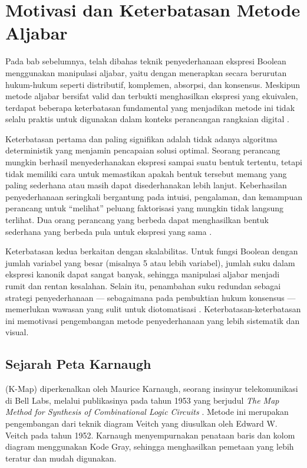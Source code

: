 \section{Motivasi dan Keterbatasan Metode Aljabar}

Pada bab sebelumnya, telah dibahas teknik penyederhanaan ekspresi Boolean menggunakan manipulasi aljabar, yaitu dengan menerapkan secara berurutan hukum-hukum seperti distributif, komplemen, absorpsi, dan konsensus. Meskipun metode aljabar bersifat valid dan terbukti menghasilkan ekspresi yang ekuivalen, terdapat beberapa keterbatasan fundamental yang menjadikan metode ini tidak selalu praktis untuk digunakan dalam konteks perancangan rangkaian digital \cite{rosen2019}.

Keterbatasan pertama dan paling signifikan adalah tidak adanya algoritma deterministik yang menjamin pencapaian solusi optimal. Seorang perancang mungkin berhasil menyederhanakan ekspresi sampai suatu bentuk tertentu, tetapi tidak memiliki cara untuk memastikan apakah bentuk tersebut memang yang paling sederhana atau masih dapat disederhanakan lebih lanjut. Keberhasilan penyederhanaan seringkali bergantung pada intuisi, pengalaman, dan kemampuan perancang untuk ``melihat'' peluang faktorisasi yang mungkin tidak langsung terlihat. Dua orang perancang yang berbeda dapat menghasilkan bentuk sederhana yang berbeda pula untuk ekspresi yang sama \cite{allaboutcircuits_boolean}.

Keterbatasan kedua berkaitan dengan skalabilitas. Untuk fungsi Boolean dengan jumlah variabel yang besar (misalnya 5 atau lebih variabel), jumlah suku dalam ekspresi kanonik dapat sangat banyak, sehingga manipulasi aljabar menjadi rumit dan rentan kesalahan. Selain itu, penambahan suku redundan sebagai strategi penyederhanaan --- sebagaimana pada pembuktian hukum konsensus --- memerlukan wawasan yang sulit untuk diotomatisasi \cite{mit_6042}. Keterbatasan-keterbatasan ini memotivasi pengembangan metode penyederhanaan yang lebih sistematik dan visual.

\subsection{Sejarah Peta Karnaugh}

 (K-Map) diperkenalkan oleh Maurice Karnaugh, seorang insinyur telekomunikasi di Bell Labs, melalui publikasinya pada tahun 1953 yang berjudul \textit{The Map Method for Synthesis of Combinational Logic Circuits} \cite{karnaugh1953}. Metode ini merupakan pengembangan dari teknik diagram Veitch yang diusulkan oleh Edward W. Veitch pada tahun 1952. Karnaugh menyempurnakan penataan baris dan kolom diagram menggunakan Kode Gray, sehingga menghasilkan pemetaan yang lebih teratur dan mudah digunakan.

